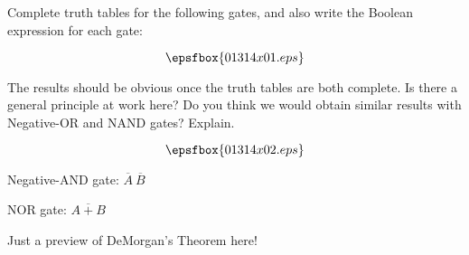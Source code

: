

Complete truth tables for the following gates, and also write the Boolean expression for each gate:

$$\epsfbox{01314x01.eps}$$

The results should be obvious once the truth tables are both complete.  Is there a general principle at work here?  Do you think we would obtain similar results with Negative-OR and NAND gates?  Explain.







$$\epsfbox{01314x02.eps}$$

Negative-AND gate: $\overline{A} \> \overline{B}$

\vskip 10pt

NOR gate: $\overline{A + B}$







Just a preview of DeMorgan's Theorem here!



